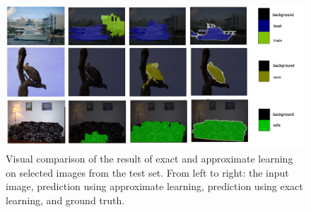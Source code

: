 \begin{figure}
\centering
\includegraphics[width=\linewidth]{figure}
\caption{%
    Visual comparison of the result of exact and approximate learning on
    selected images from the test set.  From left to right: the input image,
    prediction using approximate learning, prediction using exact learning, and
    ground truth.
\label{visual}}
\end{figure}

